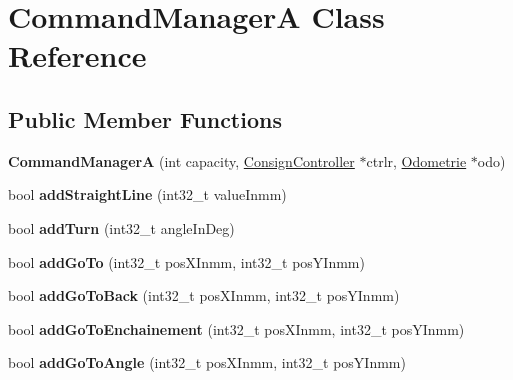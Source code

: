 \hypertarget{classCommandManagerA}{}\section{Command\+ManagerA Class Reference}
\label{classCommandManagerA}
\subsection*{Public Member Functions}
\begin{DoxyCompactItemize}
\item 
\mbox{\label{classCommandManagerA_a6822113dab6c173fa3375453c766361d}} 
{\bfseries Command\+ManagerA} (int capacity, \hyperlink{classConsignController}{Consign\+Controller} $\ast$ctrlr, \hyperlink{classOdometrie}{Odometrie} $\ast$odo)
\item 
\mbox{\label{classCommandManagerA_a2dae6504721d5eaa0c4d1ae58cb0cdcc}} 
bool {\bfseries add\+Straight\+Line} (int32\+\_\+t value\+Inmm)
\item 
\mbox{\label{classCommandManagerA_a962381653cece51ae2278284c646d678}} 
bool {\bfseries add\+Turn} (int32\+\_\+t angle\+In\+Deg)
\item 
\mbox{\label{classCommandManagerA_a7b6f1b708edcd9dcbf636934ebd6fee4}} 
bool {\bfseries add\+Go\+To} (int32\+\_\+t pos\+X\+Inmm, int32\+\_\+t pos\+Y\+Inmm)
\item 
\mbox{\label{classCommandManagerA_a0d7a4731eeaab720cd4a9fc135c64084}} 
bool {\bfseries add\+Go\+To\+Back} (int32\+\_\+t pos\+X\+Inmm, int32\+\_\+t pos\+Y\+Inmm)
\item 
\mbox{\label{classCommandManagerA_ac1f8a98137f08b0974cdee6bfda7ecf4}} 
bool {\bfseries add\+Go\+To\+Enchainement} (int32\+\_\+t pos\+X\+Inmm, int32\+\_\+t pos\+Y\+Inmm)
\item 
\mbox{\label{classCommandManagerA_a4d8ac8cedd147da82fca1d73970e7b84}} 
bool {\bfseries add\+Go\+To\+Angle} (int32\+\_\+t pos\+X\+Inmm, int32\+\_\+t pos\+Y\+Inmm)
\item 
\mbox{\label{classCommandManagerA_a7ba985f99583c8733999c5eed02912b5}} 

\end{DoxyCompactItemize}
